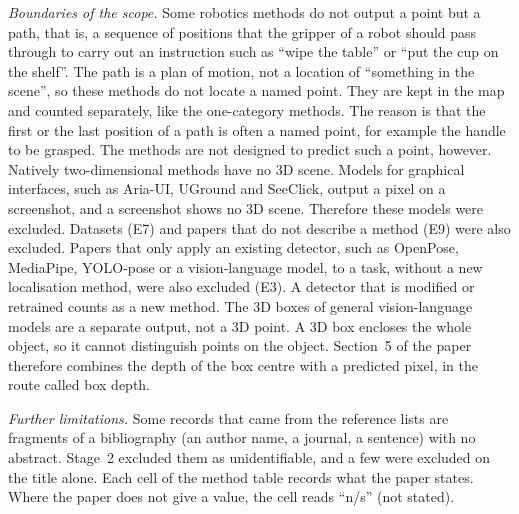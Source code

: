 \emph{Boundaries of the scope.}
Some robotics methods do not output a point but a path, that is, a sequence of positions that the gripper of a robot should pass through to carry out an instruction such as ``wipe the table'' or ``put the cup on the shelf''.
The path is a plan of motion, not a location of ``something in the scene'', so these methods do not locate a named point.
They are kept in the map and counted separately, like the one-category methods.
The reason is that the first or the last position of a path is often a named point, for example the handle to be grasped.
The methods are not designed to predict such a point, however.
Natively two-dimensional methods have no 3D scene.
Models for graphical interfaces, such as Aria-UI, UGround and SeeClick, output a pixel on a screenshot, and a screenshot shows no 3D scene.
Therefore these models were excluded.
Datasets (E7) and papers that do not describe a method (E9) were also excluded.
Papers that only apply an existing detector, such as OpenPose, MediaPipe, YOLO-pose or a vision-language model, to a task, without a new localisation method, were also excluded (E3).
A detector that is modified or retrained counts as a new method.
The 3D boxes of general vision-language models are a separate output, not a 3D point.
A 3D box encloses the whole object, so it cannot distinguish points on the object.
Section~5 of the paper therefore combines the depth of the box centre with a predicted pixel, in the route called box depth.

\emph{Further limitations.}
Some records that came from the reference lists are fragments of a bibliography (an author name, a journal, a sentence) with no abstract.
Stage~2 excluded them as unidentifiable, and a few were excluded on the title alone.
Each cell of the method table records what the paper states.
Where the paper does not give a value, the cell reads ``n/s'' (not stated).

